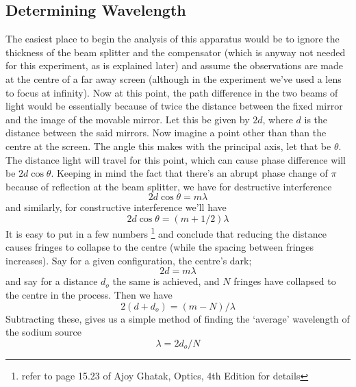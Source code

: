 	\subsection{Determining Wavelength}
		The easiest place to begin the analysis of this apparatus would be to ignore the thickness of the beam splitter and the compensator (which is anyway not needed for this experiment, as is explained later) and assume the observations are made at the centre of a far away screen (although in the experiment we've used a lens to focus at infinity). Now at this point, the path difference in the two beams of light would be essentially because of twice the distance between the fixed mirror and the image of the movable mirror. Let this be given by $2d$, where $d$ is the distance between the said mirrors. Now imagine a point other than than the centre at the screen. The angle this makes with the principal axis, let that be $\theta$. The distance light will travel for this point, which can cause phase difference will be $2d \cos{\theta}$. Keeping in mind the fact that there's an abrupt phase change of $\pi$ because of reflection at the beam splitter, we have for destructive interference
		\begin{equation}
			2d\cos{\theta}=m\lambda
		\end{equation}
		and similarly, for constructive interference we'll have
		\begin{equation}
			2d\cos{\theta}=(m+1/2)\lambda
		\end{equation}
		It is easy to put in a few numbers \footnote{refer to page 15.23 of Ajoy Ghatak, Optics, 4th Edition for details} and conclude that reducing the distance causes fringes to collapse to the centre (while the spacing between fringes increases). Say for a given configuration, the centre's dark;
		\begin{equation}
			2d=m\lambda
		\end{equation}
		and say for a distance $d_o$ the same is achieved, and $N$ fringes have collapsed to the centre in the process. Then we have
		\begin{equation}
			2(d+d_o)=(m-N)/\lambda
		\end{equation}
		Subtracting these, gives us a simple method of finding the `average' wavelength of the sodium source
		\begin{equation}
			\lambda=2d_o/N
			\label{5_eq1}
		\end{equation}

